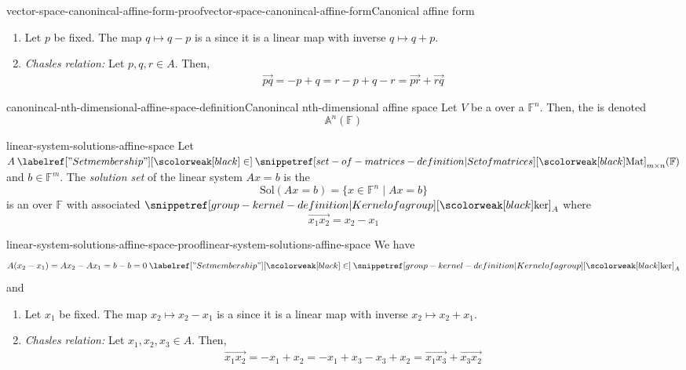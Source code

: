 \documentclass[preview]{standalone}
\begin{document}
\begin{snippetproof}{vector-space-canonincal-affine-form-proof}{vector-space-canonincal-affine-form}{Canonical affine form}
    \begin{enumerate}
        \item Let \(p\) be fixed. The map \(q \mapsto q - p\) is a \bijective[bijection] since it is a linear map with inverse \(q \mapsto q + p\).
        \item \emph{Chasles relation:} Let \(p, q, r \in A\). Then,
        \begin{align*}
            \vec{pq} = -p + q = r-p+q-r = \vec{pr} + \vec{rq}
        \end{align*}
    \end{enumerate}
\end{snippetproof}

\begin{snippetdefinition}{canonincal-nth-dimensional-affine-space-definition}{Canonincal nth-dimensional affine space}
    Let \(V\) be a \vectorspace over a \field \(\mathbb{F}^n\).
    Then, the  \affinespace is denoted
    \[
        \mathbb{A}^n(\mathbb{F})
    \]
\end{snippetdefinition}

\begin{snippetproposition}{linear-system-solutions-affine-space}{}
    Let \(A \in \matrices_{m \times n}(\mathbb{F})\)
    and \(b \in \mathbb{F}^m\).
    The \emph{solution set} of the linear system \(Ax = b\) is the \set
    \[
        \text{Sol}(Ax = b) = \{x \in \mathbb{F}^n \mid Ax = b\}
    \]
    is an \affinespace over \(\mathbb{F}\) with associated \vectorspace
    \(\grpker_A\) where
    \[
        \vec{x_1x_2} = x_2 - x_1
    \]
\end{snippetproposition}

\begin{snippetproof}{linear-system-solutions-affine-space-proof}{linear-system-solutions-affine-space}{}
    We have
    \[
        A(x_2 - x_1) = Ax_2 - Ax_1 = b - b = 0 \in \grpker_A
    \]
    and
    \begin{enumerate}
        \item Let \(x_1\) be fixed. The map \(x_2 \mapsto x_2 - x_1\) is a \bijective[bijection] since it is a linear map with inverse \(x_2 \mapsto x_2 + x_1\).
        \item \emph{Chasles relation:} Let \(x_1, x_2, x_3 \in A\). Then,
        \begin{align*}
            \vec{x_1x_2} = -x_1 + x_2 = -x_1 + x_3 - x_3 + x_2 = \vec{x_1x_3} + \vec{x_3x_2}
        \end{align*}
    \end{enumerate}
\end{snippetproof}
\end{document}
